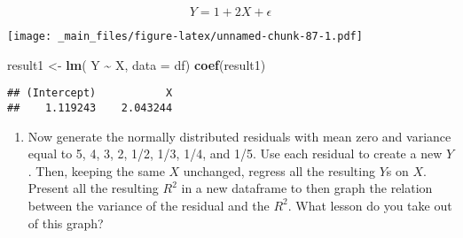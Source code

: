 \documentclass[
]{book}
\newenvironment{Shaded}{\begin{snugshade}}{\end{snugshade}}
\newcommand{\AttributeTok}[1]{\textcolor[rgb]{0.13,0.29,0.53}{#1}}
\newcommand{\ConstantTok}[1]{\textcolor[rgb]{0.56,0.35,0.01}{#1}}
\newcommand{\DecValTok}[1]{\textcolor[rgb]{0.00,0.00,0.81}{#1}}
\newcommand{\FunctionTok}[1]{\textcolor[rgb]{0.13,0.29,0.53}{\textbf{#1}}}
\newcommand{\NormalTok}[1]{#1}
\newcommand{\OtherTok}[1]{\textcolor[rgb]{0.56,0.35,0.01}{#1}}
\newcommand{\SpecialCharTok}[1]{\textcolor[rgb]{0.81,0.36,0.00}{\textbf{#1}}}
\newcommand{\StringTok}[1]{\textcolor[rgb]{0.31,0.60,0.02}{#1}}
\providecommand{\tightlist}{%
  \setlength{\itemsep}{0pt}\setlength{\parskip}{0pt}}
\begin{document}
\[Y=1+2X+\epsilon\]

\begin{Shaded}
\end{Shaded}

\texttt{[image: \_main\_files/figure-latex/unnamed-chunk-87-1.pdf]}

\begin{Shaded}
\begin{Highlighting}[]
\NormalTok{result1 }\OtherTok{\textless{}{-}} \FunctionTok{lm}\NormalTok{( Y }\SpecialCharTok{\textasciitilde{}}\NormalTok{ X, }\AttributeTok{data =}\NormalTok{ df)}
\FunctionTok{coef}\NormalTok{(result1)}
\end{Highlighting}
\end{Shaded}

\begin{verbatim}
## (Intercept)           X 
##    1.119243    2.043244
\end{verbatim}

\begin{enumerate}
\def\labelenumi{\arabic{enumi}.}
\setcounter{enumi}{1}
\tightlist
\item
  Now generate the normally distributed residuals with mean zero and variance equal to 5, 4, 3, 2, 1/2, 1/3, 1/4, and 1/5. Use each residual to create a new \(Y\). Then, keeping the same \(X\) unchanged, regress all the resulting \(Y\)s on \(X\). Present all the resulting \(R^2\) in a new dataframe to then graph the relation between the variance of the residual and the \(R^2\). What lesson do you take out of this graph?
\end{enumerate}
\end{document}
